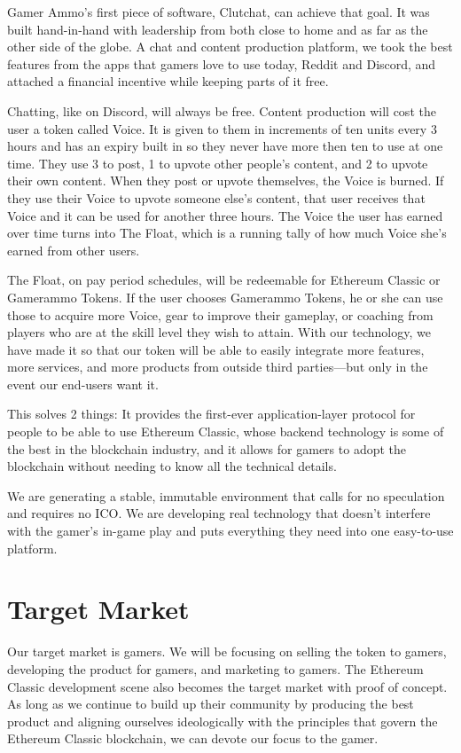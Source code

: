 \documentclass[11pt]{report}
\begin{document}
Gamer Ammo's first piece of software, Clutchat, can achieve that goal. It was built hand-in-hand with leadership from both close to home and as far as the other side of the globe. A chat and content production platform, we took the best features from the apps that gamers love to use today, Reddit and Discord, and attached a financial incentive while keeping parts of it free.

Chatting, like on Discord,\cite{discord} will always be free. Content production will cost the user a token called Voice. It is given to them in increments of ten units every 3 hours and has an expiry built in so they never have more then ten to use at one time. They use 3 to post, 1 to upvote other people's content, and 2 to upvote their own content. When they post or upvote themselves, the Voice is burned. If they use their Voice to upvote someone else's content, that user receives that Voice and it can be used for another three hours. The Voice the user has earned over time turns into The Float, which is a running tally of how much Voice she's earned from other users.

The Float, on pay period schedules, will be redeemable for Ethereum Classic or Gamerammo Tokens. If the user chooses Gamerammo Tokens, he or she can  use those to acquire more Voice, gear to improve their gameplay, or coaching from players who are at the skill level they wish to attain. With our technology, we have made it so that our token will be able to easily integrate more features, more services, and more products from outside third parties---but only in the event our end-users want it.

This solves 2 things: It provides the first-ever application-layer protocol for people to be able to use Ethereum Classic, whose backend technology is some of the best in the blockchain industry, and it allows for gamers to adopt the blockchain without needing to know all the technical details.

We are generating a stable, immutable environment that calls for no speculation and requires no ICO. We are developing real technology that doesn't interfere with the gamer's in-game play and puts everything they need into one easy-to-use platform.
\section{Target Market}
Our target market is gamers. We will be focusing on selling the token to gamers, developing the product for gamers, and marketing to gamers. The Ethereum Classic development scene also becomes the target market with proof of concept. As long as we continue to build up their community by producing the best product and aligning ourselves ideologically with the principles that govern the Ethereum Classic blockchain, we can devote our focus to the gamer.
\end{document}
